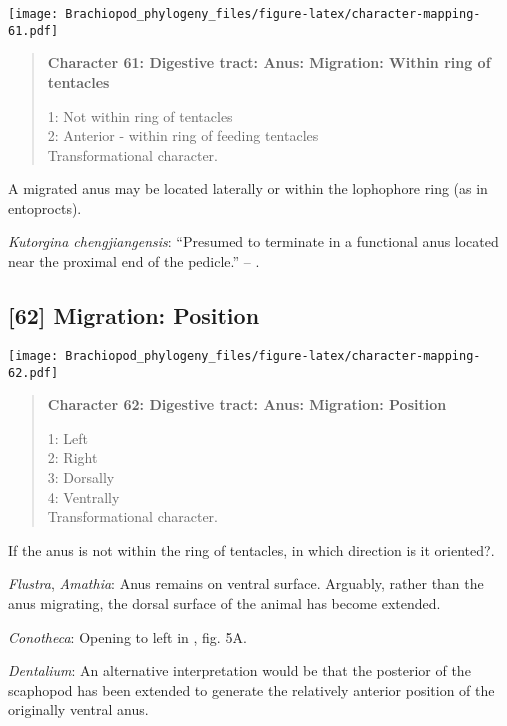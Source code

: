 \documentclass[openany]{book}
\theoremstyle{definition}
\theoremstyle{definition}
\theoremstyle{definition}
\theoremstyle{remark}
\begin{document}
\texttt{[image: Brachiopod\_phylogeny\_files/figure-latex/character-mapping-61.pdf]}

\begin{quote}
\textbf{Character 61: Digestive tract: Anus: Migration: Within ring of
tentacles}

1: Not within ring of tentacles\\
2: Anterior - within ring of feeding tentacles\\
Transformational character.
\end{quote}

A migrated anus may be located laterally or within the lophophore ring
(as in entoprocts).

\hypertarget{Kutorgina_chengjiangensis-coding-61}{}
\emph{Kutorgina chengjiangensis}: ``Presumed to terminate in a
functional anus located near the proximal end of the pedicle.'' --
\citet{Zhang2007Rhynchonelliformeanbrachiopods}.

\subsection*{{[}62{]} Migration: Position}\label{migration-position}

\texttt{[image: Brachiopod\_phylogeny\_files/figure-latex/character-mapping-62.pdf]}

\begin{quote}
\textbf{Character 62: Digestive tract: Anus: Migration: Position}

1: Left\\
2: Right\\
3: Dorsally\\
4: Ventrally\\
Transformational character.
\end{quote}

If the anus is not within the ring of tentacles, in which direction is
it oriented?.

\hypertarget{Amathia-coding-62}{}
\emph{Flustra}, \emph{Amathia}: Anus remains on ventral surface.
Arguably, rather than the anus migrating, the dorsal surface of the
animal has become extended.

\hypertarget{Conotheca-coding-62}{}
\emph{Conotheca}: Opening to left in \citet{Devaere2014}, fig. 5A.

\hypertarget{Dentalium-coding-62}{}
\emph{Dentalium}: An alternative interpretation would be that the
posterior of the scaphopod has been extended to generate the relatively
anterior position of the originally ventral anus.
\end{document}
